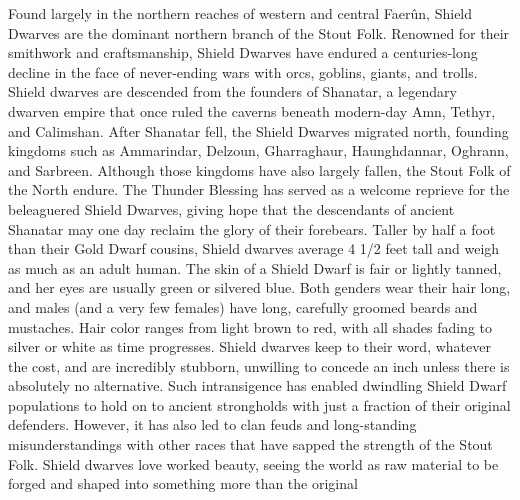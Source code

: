 
Found largely in the northern reaches of western and central Faerûn, Shield Dwarves are the dominant northern branch of the Stout Folk. Renowned for their smithwork and craftsmanship, Shield Dwarves have endured a centuries-long decline in the face of never-ending wars with orcs, goblins, giants, and trolls. Shield dwarves are descended from the founders of Shanatar, a legendary dwarven empire that once ruled the caverns beneath modern-day Amn, Tethyr, and Calimshan. After Shanatar fell, the Shield Dwarves migrated north, founding kingdoms such as Ammarindar, Delzoun, Gharraghaur, Haunghdannar, Oghrann, and Sarbreen. Although those kingdoms have also largely fallen, the Stout Folk of the North endure. The Thunder Blessing has served as a welcome reprieve for the beleaguered Shield Dwarves, giving hope that the descendants of ancient Shanatar may one day reclaim the glory of their forebears. Taller by half a foot than their Gold Dwarf cousins, Shield dwarves average 4 1/2 feet tall and weigh as much as an adult human. The skin of a Shield Dwarf is fair or lightly tanned, and her eyes are usually green or silvered blue. Both genders wear their hair long, and males (and a very few females) have long, carefully groomed beards and mustaches. Hair color ranges from light brown to red, with all shades fading to silver or white as time progresses. Shield dwarves keep to their word, whatever the cost, and are incredibly stubborn, unwilling to concede an inch unless there is absolutely no alternative. Such intransigence has enabled dwindling Shield Dwarf populations to hold on to ancient strongholds with just a fraction of their original defenders. However, it has also led to clan feuds and long-standing misunderstandings with other races that have sapped the strength of the Stout Folk. Shield dwarves love worked beauty, seeing the world as raw material to be forged and shaped into something more than the original

